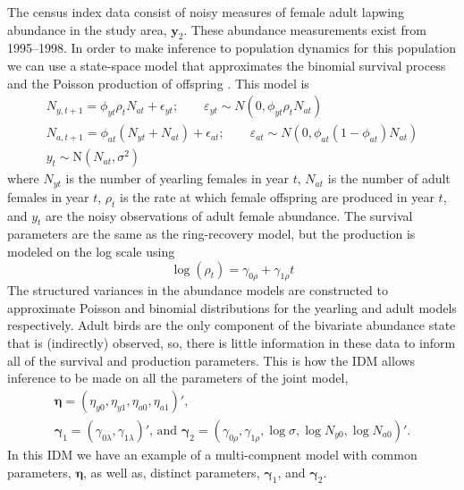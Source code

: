 \documentclass[12pt]{article}
\newcommand{\by}{\mathbf{y}}
\newcommand{\bn}{\boldsymbol{\eta}}
\newcommand{\bg}{\boldsymbol{\gamma}}
\newcommand{\tN}{\text{N}}
\begin{document}
The census index data consist of noisy measures of female adult lapwing abundance in the study area, $\by_2$. These abundance measurements exist from 1995--1998. In order to make inference to population dynamics for this population we can use a state-space model that approximates the binomial survival process and the Poisson production of offspring \citep{besbeas2002integrating}. This model is
\begin{equation}
\begin{gathered}
N_{y,t+1} = \phi_{yt} \rho_t N_{at} + \epsilon_{yt};\qquad \varepsilon_{yt} \sim N(0, \phi_{yt} \rho_t N_{at})\\
N_{a,t+1} = \phi_{at} (N_{yt} + N_{at}) + \epsilon_{at};\qquad \varepsilon_{at} \sim N(0, \phi_{at} (1-\phi_{at}) N_{at})\\
y_{t} \sim \tN(N_{at}, \sigma^2)
\end{gathered}
\end{equation}
where $N_{yt}$ is the number of yearling females in year $t$, $N_{at}$ is the number of adult females in year $t$, $\rho_t$ is the rate at which female offspring are produced in year $t$, and $y_t$ are the noisy observations of adult female abundance. The survival parameters are the same as the ring-recovery model, but the production is modeled on the log scale using
\[
\log (\rho_t) = \gamma_{0\rho} + \gamma_{1\rho} t
\]
The structured variances in the abundance models are constructed to approximate Poisson and binomial distributions for the yearling and adult models respectively. Adult birds are the only component of the bivariate abundance state that is (indirectly) observed, so, there is little information in these data to inform all of the survival and production parameters. This is how the IDM allows inference to be made on all the parameters of the joint model, 
\[
\begin{gathered} 
\bn = (\eta_{y0}, \eta_{y1}, \eta_{a0}, \eta_{a1})',  \\
\bg_1 = (\gamma_{0\lambda}, \gamma_{1\lambda})' \text{, and } \bg_2 = (\gamma_{0\rho}, \gamma_{1\rho}, \log\sigma, \log N_{y0}, \log N_{a0})'.
\end{gathered}
\]
In this IDM we have an example of a multi-compnent model with common parameters, $\bn$, as well as, distinct parameters, $\bg_1$, and $\bg_2$. 
\end{document}
